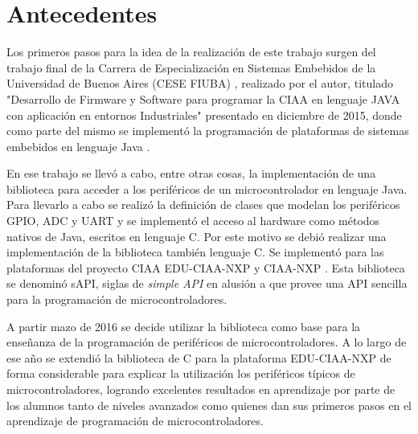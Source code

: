\section{Antecedentes}
\label{sec:antecedentes}

Los primeros pasos para la idea de la realización de este trabajo surgen del trabajo final de la Carrera de Especialización en Sistemas Embebidos de la Universidad de Buenos Aires (CESE FIUBA) \cite{CESE}, realizado por el autor, titulado "Desarrollo de Firmware y Software para programar la CIAA en lenguaje JAVA con aplicación en entornos Industriales" \cite{CeseTesisEric} presentado en diciembre de 2015, donde como parte del mismo se implementó la programación de plataformas de sistemas embebidos en lenguaje Java \cite{Java}. 

En ese trabajo se llevó a cabo, entre otras cosas, la implementación de una biblioteca para acceder a los periféricos de un microcontrolador en lenguaje Java. Para llevarlo a cabo se realizó la definición de clases que modelan los periféricos GPIO, ADC y UART y se implementó el acceso al hardware como métodos nativos de Java, escritos en lenguaje C. Por este motivo se debió realizar una implementación de la biblioteca también lenguaje C. 
Se implementó para las plataformas del proyecto CIAA EDU-CIAA-NXP \cite{EDUCIAA} y CIAA-NXP \cite{CIAANXP}.
Esta biblioteca se denominó sAPI, siglas de \emph{simple API} en alusión a que provee una API sencilla para la programación de microcontroladores.


A partir mazo de 2016 se decide utilizar la biblioteca como base para la enseñanza de la programación de periféricos de microcontroladores.
A lo largo de ese año se extendió la biblioteca de C para la plataforma EDU-CIAA-NXP de forma considerable para explicar la utilización los periféricos típicos de microcontroladores, logrando excelentes resultados en aprendizaje por parte de los alumnos tanto de niveles avanzados como quienes dan sus primeros pasos en el aprendizaje de programación de microcontroladores.

